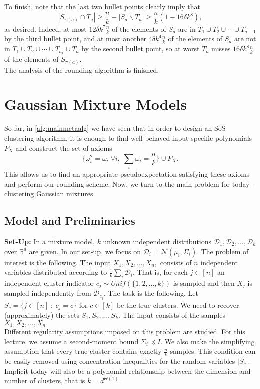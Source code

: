 \documentclass[12pt]{article}%
\newcommand{\D}{\mathcal{D}}
\newcommand{\normal}{\mathcal{N}}
\begin{document}
\noindent
To finish, note that the last two bullet points clearly imply that 
$$|S_{\pi(a)} \cap T_a|\ge \frac{n}{k} - |S_a\backslash T_a|\ge
\frac{n}{k}(1 - 16\delta k^8),
$$
as desired. Indeed, at most $12\delta k^7\frac{n}{k}$ of the elements of $S_a$ are in 
$T_1\cup T_2\cup \cdots \cup T_{a-1}$ by the third bullet point, and at most another $4\delta k^4\frac{n}{k}$ of the elements of $S_a$ are not in 
$T_1\cup T_2\cup \cdots \cup T_{a_1}\cup T_a$ by the second bullet point, so at worst $T_a$ misses $16\delta k^8\frac{n}{k}$ of the elements of $S_{\pi(a)}.$\\

\noindent
The analysis of the rounding algorithm is finished.

\section{Gaussian Mixture Models}
\label{sec:gaussianmixture}
So far, in \cref{alg:mainmetaalg} we have seen that in order to design an SoS clustering algorithm, it is enough to find well-behaved input-specific polynomials $P_X$ and construct the set of axioms 
$$
\{
\omega_i^2 = \omega_i\; \forall i,\;
\sum_{i}\omega_i = \frac{n}{k}\}\cup P_X. 
$$
This allows us to find an appropriate pseudoexpectation satisfying these axioms and perform our rounding scheme. 
\noindent
Now, we turn to the main problem for today - clustering Gaussian mixtures.
\subsection{Model and Preliminaries}
\textbf{Set-Up: }In a mixture model, $k$ unknown independent distributions $\D_1, \D_2, \ldots, \D_k$ over $\mathbb{R}^d$ are given. In our set-up, we focus on $\D_i = \normal(\mu_i, \Sigma_i).$ The problem of interest is the following. 
The input $X_1, X_2, \ldots, X_n,$ consists of $n$ independent variables distributed according to
$\frac{1}{k}\sum_i \D_i.$ That is, for each $j \in [n]$ an independent cluster indicator $c_j \sim Unif(\{1,2,\ldots, k\})$ is sampled and then $X_j$ is sampled independently from $\D_{c_j}.$ The task is the following. Let $S_c = \{j \in [n]\; : \: c_j  = c\}$ for $c\in [k]$ be the true clusters. We need to recover (approximately) the sets $S_1, S_2, \ldots, S_k.$ The input consists of the samples $X_1, X_2, \ldots, X_n.$\\


\noindent
Different regularity assumptions imposed on this problem are studied. For this lecture, we assume a second-moment bound $\Sigma_i \preceq I.$ We also make the simplifying assumption that every true cluster contains exactly $\frac{n}{k}$ samples. This condition can be easily removed using concentration inequalities for the random variables $|S_c|.$ Implicit today will also be a polynomial relationship between the dimension and number of clusters, that is 
$k = d^{\Theta(1)}.$\\
\end{document}
